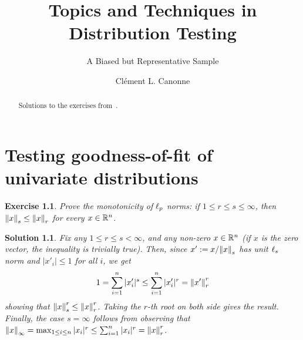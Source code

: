 \documentclass[biber,plain]{nowfnt} %
\title{Topics and Techniques in Distribution Testing}
\subtitle{A Biased but Representative Sample}
\author[1]{Cl\'ement L. Canonne}
\affil[1]{University of Sydney; clement.canonne@sydney.edu.au}
\newtheorem{question}{Exercise}[chapter]
\newtheorem{solution}{Solution}[chapter]
\begin{document}
\makeabstracttitle
\begin{abstract}
Solutions to the exercises from~\citet{CIT-114}.
\end{abstract}

\setcounter{chapter}{1}
\chapter{Testing goodness-of-fit of univariate distributions}
  \label{chap:identity}
  
  
 \begin{question}\label{ex:identity:monotonicity:lp}
  Prove the monotonicity of $\lp[p]$ norms: if $1\leq r\leq s \leq \infty$, then $\norm{x}_s \leq \norm{x}_r$ for every $x\in \R^n$.
\end{question}
\begin{solution}
Fix any $1\leq r\leq s < \infty$, and any non-zero $x\in\R^n$ (if $x$ is the zero vector, the inequality is trivially true). Then, since $x' \eqdef x/\norm{x}_s$ has unit $\lp[s]$ norm and $|x'_i| \leq 1$ for all $i$, we get
\[
	1 = \sum_{i=1}^n |x'_i|^s \leq \sum_{i=1}^n |x'_i|^r = \norm{x'}_r^r
\]
showing that $\norm{x}_s^r \leq \norm{x}_r^r$. Taking the $r$-th root on both side gives the result. Finally, the case $s=\infty$ follows from observing that $\norminf{x} = \max_{1\leq i\leq n} |x_i|^r \leq \sum_{i=1}^n |x_i|^r = \norm{x}_r^r$. 
\end{solution}
\end{document}
